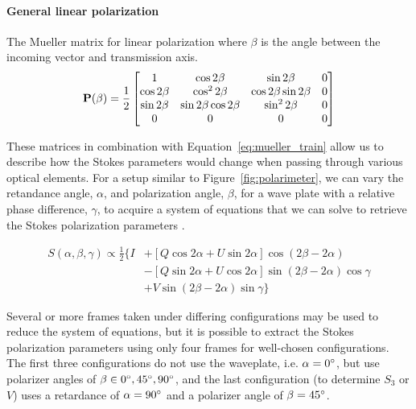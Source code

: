 \paragraph*{General linear polarization}
The Mueller matrix for linear polarization where $\beta$ is the angle between the incoming vector and transmission axis.
\begin{equation}
    \mathbf{P}(\beta) = \frac{1}{2}
    \begin{bmatrix}
        1            & \cos 2 \beta              & \sin 2 \beta              & 0 \\
        \cos 2 \beta & \cos^{2} 2 \beta          & \cos 2 \beta \sin 2 \beta & 0 \\
        \sin 2 \beta & \sin 2 \beta \cos 2 \beta & \sin^{2} 2 \beta          & 0 \\
        0            & 0                         & 0                         & 0 \\
    \end{bmatrix}
    \label{matrix:polarizer}
\end{equation}
\prgph

These matrices in combination with Equation~\ref{eq:mueller_train} allow us to describe how the Stokes parameters would change when passing through various optical elements. For a setup similar to Figure~\ref{fig:polarimeter}, we can vary the retandance angle, $\alpha$, and polarization angle, $\beta$, for a wave plate with a relative phase difference, $\gamma$, to acquire a system of equations that we can solve to retrieve the Stokes polarization parameters \citep{waveplate_in_specpol}.

\begin{equation}
    \begin{split}
        S(\alpha, \beta, \gamma) \propto \frac{1}{2} \{ I & + [Q \cos2\alpha + U \sin2\alpha] \cos(2\beta - 2\alpha) \\
        & - [Q \sin2\alpha + U \cos2\alpha] \sin(2\beta - 2\alpha) \cos\gamma \label{eq:Stokes_intensity} \\
        & + V \sin(2\beta - 2\alpha)\sin\gamma \}
    \end{split}
\end{equation}

Several or more frames taken under differing configurations may be used to reduce the system of equations, but it is possible to extract the Stokes polarization parameters using only four frames for well-chosen configurations. The first three configurations do not use the waveplate, i.e. $\alpha = 0\hbox{$^\circ$}$, but use polarizer angles of $\beta \in {0\hbox{$^\circ$}, 45\hbox{$^\circ$}, 90\hbox{$^\circ$}}$, and the last configuration (to determine $S_{3}$ or $V$) uses a retardance of $\alpha = 90\hbox{$^\circ$}$ and a polarizer angle of $\beta = 45\hbox{$^\circ$}$.
\prgph

